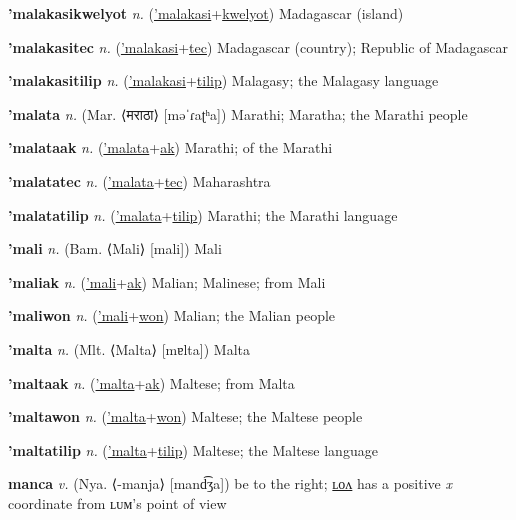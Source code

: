 \textbf{\hypertarget{'malakasikwelyot}{'malakasikwelyot}} \textit{n.} (\hyperlink{'malakasi}{'malakasi}+\allowbreak \hyperlink{kwelyot}{kwelyot})
Madagascar (island)

\textbf{\hypertarget{'malakasitec}{'malakasitec}} \textit{n.} (\hyperlink{'malakasi}{'malakasi}+\allowbreak \hyperlink{tec}{tec})
Madagascar (country); Republic of Madagascar

\textbf{\hypertarget{'malakasitilip}{'malakasitilip}} \textit{n.} (\hyperlink{'malakasi}{'malakasi}+\allowbreak \hyperlink{tilip}{tilip})
Malagasy; the Malagasy language

\textbf{\hypertarget{'malata}{'malata}} \textit{n.} (Mar. ⟨{\devanagari{}मराठा}⟩ [məˈɾaʈʰa])
Marathi; Maratha; the Marathi people

\textbf{\hypertarget{'malataak}{'malataak}} \textit{n.} (\hyperlink{'malata}{'malata}+\allowbreak \hyperlink{ak}{ak})
Marathi; of the Marathi

\textbf{\hypertarget{'malatatec}{'malatatec}} \textit{n.} (\hyperlink{'malata}{'malata}+\allowbreak \hyperlink{tec}{tec})
Maharashtra

\textbf{\hypertarget{'malatatilip}{'malatatilip}} \textit{n.} (\hyperlink{'malata}{'malata}+\allowbreak \hyperlink{tilip}{tilip})
Marathi; the Marathi language

\textbf{\hypertarget{'mali}{'mali}} \textit{n.} (Bam. ⟨Mali⟩ [mali])
Mali

\textbf{\hypertarget{'maliak}{'maliak}} \textit{n.} (\hyperlink{'mali}{'mali}+\allowbreak \hyperlink{ak}{ak})
Malian; Malinese; from Mali

\textbf{\hypertarget{'maliwon}{'maliwon}} \textit{n.} (\hyperlink{'mali}{'mali}+\allowbreak \hyperlink{won}{won})
Malian; the Malian people

\textbf{\hypertarget{'malta}{'malta}} \textit{n.} (Mlt. ⟨Malta⟩ [mɐlta])
Malta

\textbf{\hypertarget{'maltaak}{'maltaak}} \textit{n.} (\hyperlink{'malta}{'malta}+\allowbreak \hyperlink{ak}{ak})
Maltese; from Malta

\textbf{\hypertarget{'maltawon}{'maltawon}} \textit{n.} (\hyperlink{'malta}{'malta}+\allowbreak \hyperlink{won}{won})
Maltese; the Maltese people

\textbf{\hypertarget{'maltatilip}{'maltatilip}} \textit{n.} (\hyperlink{'malta}{'malta}+\allowbreak \hyperlink{tilip}{tilip})
Maltese; the Maltese language

\textbf{\hypertarget{manca}{manca}} \textit{v.} (Nya. ⟨-manja⟩ [mand͡ʒa])
be to the right; \hyperlink{mancalon}{ʟᴏᴧ} has a positive \textit{x} coordinate from ʟᴜᴍ’s point of view

